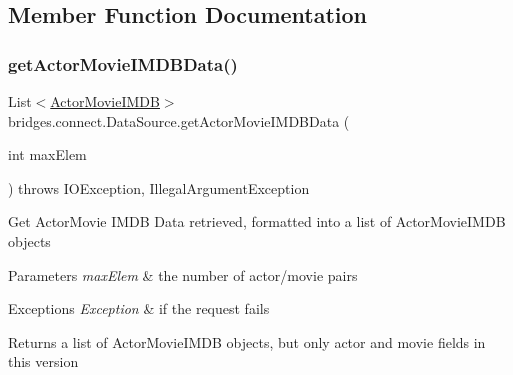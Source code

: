 \subsection{Member Function Documentation}
\mbox{\label{classbridges_1_1connect_1_1_data_source_ab18803b850f3c867306723d1a1be337e}} 
\subsubsection{\texorpdfstring{get\+Actor\+Movie\+I\+M\+D\+B\+Data()}{getActorMovieIMDBData()}}
{\footnotesize\ttfamily List$<$\hyperlink{classbridges_1_1data__src__dependent_1_1_actor_movie_i_m_d_b}{Actor\+Movie\+I\+M\+DB}$>$ bridges.\+connect.\+Data\+Source.\+get\+Actor\+Movie\+I\+M\+D\+B\+Data (\begin{DoxyParamCaption}\item[{int}]{max\+Elem }\end{DoxyParamCaption}) throws I\+O\+Exception, Illegal\+Argument\+Exception}

Get Actor\+Movie I\+M\+DB Data retrieved, formatted into a list of Actor\+Movie\+I\+M\+DB objects


\begin{DoxyParams}{Parameters}
{\em max\+Elem} & the number of actor/movie pairs \\
\hline
\end{DoxyParams}

\begin{DoxyExceptions}{Exceptions}
{\em Exception} & if the request fails\\
\hline
\end{DoxyExceptions}
\begin{DoxyReturn}{Returns}
a list of Actor\+Movie\+I\+M\+DB objects, but only actor and movie fields in this version 
\end{DoxyReturn}
\mbox{\label{classbridges_1_1connect_1_1_data_source_ae44e4ed7879e2755f8c66a335d8b6ad5}} 
